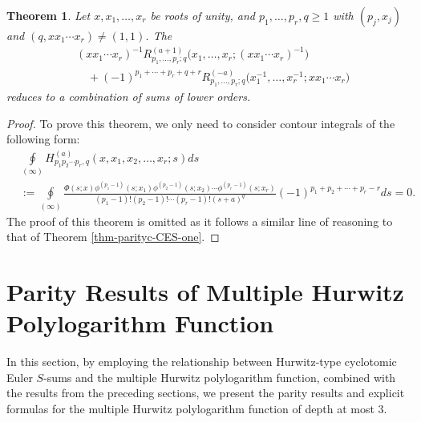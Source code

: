\documentclass[11pt]{article}
\let\oldsection\section
\renewcommand\section{\setcounter{equation}{0}\oldsection}
\theoremstyle{plain}
\newtheorem{thm}{Theorem}[section]
\theoremstyle{definition}
\begin{document}
\begin{thm}\label{thm-parityc-CES-three} Let $x,x_1,\ldots,x_r$ be roots of unity, and $p_1,\ldots,p_r,q\geq 1$ with $(p_j,x_j) $ and $ (q,xx_1\cdots x_r)\neq (1,1)$. The
\begin{align*}
&(xx_1\cdots x_r)^{-1}R_{p_1,\ldots,p_r;q}^{(a+1)}\Big(x_1,\ldots,x_r;(xx_1\cdots x_r)^{-1}\Big)\\
&\quad+(-1)^{p_1+\cdots+p_r+q+r}R_{p_1,\ldots,p_r;q}^{(-a)}\Big(x_1^{-1},\ldots,x_r^{-1};xx_1\cdots x_r\Big)
\end{align*}
reduces to a combination of sums of lower orders.
\end{thm}
\begin{proof}
To prove this theorem, we only need to consider contour integrals of the following form:
\begin{align*}
&\oint\limits_{\left( \infty  \right)}H^{(a)}_{p_1p_2\cdots p_r,q}(x,x_1,x_2,\ldots,x_r;s)ds\\
&:= \oint\limits_{\left( \infty  \right)}\frac{\Phi(s;x)\phi^{(p_1-1)}(s;x_1)\phi^{(p_2-1)}(s;x_2)\cdots\phi^{(p_r-1)}(s;x_r)}{(p_1-1)!(p_2-1)!\cdots (p_r-1)!(s+a)^q} (-1)^{p_1+p_2+\cdots+p_r-r}ds=0.
\end{align*}
The proof of this theorem is omitted as it follows a similar line of reasoning to that of Theorem \ref{thm-parityc-CES-one}.
\end{proof}

\section{Parity Results of Multiple Hurwitz Polylogarithm Function}
In this section, by employing the relationship between Hurwitz-type cyclotomic Euler $S$-sums and the multiple Hurwitz  polylogarithm function, combined with the results from the preceding sections, we present the parity results and explicit formulas for the multiple Hurwitz  polylogarithm function of depth at most 3.
\end{document}
